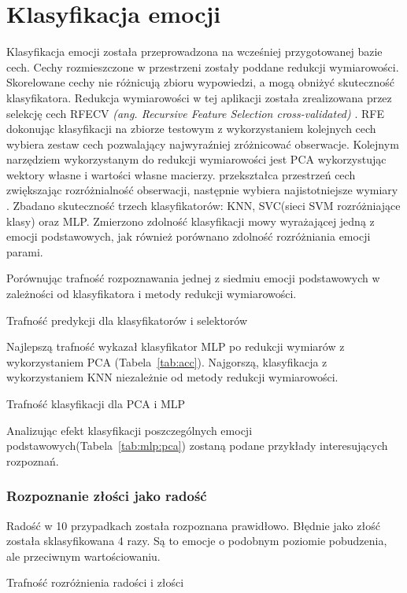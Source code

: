 \documentclass[a4paper,12pt,twoside,openany]{report}
\newcommand{\ang}[1]{\textit{(ang. #1)}}
\newcommand{\Tab}[1]{(Tabela~\ref{#1})}
\begin{document}
\section{Klasyfikacja emocji}
Klasyfikacja emocji została przeprowadzona na wcześniej przygotowanej bazie cech.
Cechy rozmieszczone w przestrzeni zostały poddane redukcji wymiarowości. 
Skorelowane cechy nie różnicują zbioru wypowiedzi, a mogą obniżyć skuteczność klasyfikatora.
Redukcja wymiarowości w tej aplikacji została zrealizowana przez selekcję cech RFECV \ang{Recursive Feature Selection cross-validated} \cite{Guyon2002}.
RFE dokonując klasyfikacji na zbiorze testowym z wykorzystaniem kolejnych cech wybiera zestaw cech pozwalający najwyraźniej zróżnicować obserwacje.
Kolejnym narzędziem wykorzystanym do redukcji wymiarowości jest PCA wykorzystując wektory własne i wartości własne macierzy.
przekształca przestrzeń cech zwiększając rozróżnialność obserwacji, następnie wybiera najistotniejsze wymiary \cite{Bro2014}.
Zbadano skuteczność trzech klasyfikatorów: KNN, SVC(sieci SVM rozróżniające klasy) oraz MLP.
Zmierzono zdolność klasyfikacji mowy wyrażającej jedną z emocji podstawowych, jak również porównano zdolność rozróżniania emocji parami.

Porównując trafność rozpoznawania jednej z siedmiu emocji podstawowych w zależności od klasyfikatora i metody redukcji wymiarowości.
\begin{table}[hc!]
	\centering
	
	\caption{Trafność predykcji dla klasyfikatorów i selektorów}
	\label{tab:acc}
\end{table}
Najlepszą trafność wykazał klasyfikator MLP po redukcji wymiarów z wykorzystaniem PCA \Tab{tab:acc}. 
Najgorszą, klasyfikacja z wykorzystaniem KNN niezależnie od metody redukcji wymiarowości.
\begin{table}[hc!]
	\centering
	
	\caption{Trafność klasyfikacji dla PCA i MLP}
	\label{tab:mlp:pca}
\end{table}
Analizując efekt klasyfikacji poszczególnych emocji podstawowych\Tab{tab:mlp:pca} zostaną podane przykłady interesujących rozpoznań.

\subsubsection{Rozpoznanie złości jako radość}
Radość w 10 przypadkach została rozpoznana prawidłowo. 
Błędnie jako złość została sklasyfikowana 4 razy. 
Są to emocje o podobnym poziomie pobudzenia, ale przeciwnym wartościowaniu.
\begin{table}[hc!]
	\centering
	
	\caption{Trafność rozróżnienia radości i złości}
\end{table}
\end{document}
